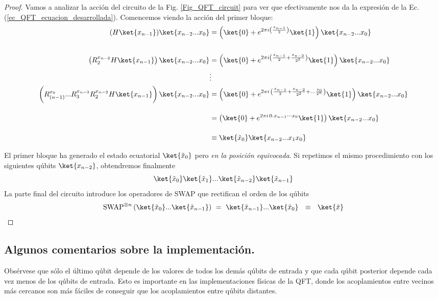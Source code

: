 \documentclass[a4paper,11pt]{book} %
\numberwithin{equation}{chapter}
\begin{document}
\begin{proof}
Vamos a analizar la acción del circuito de la Fig. \ref{Fig_QFT_circuit} para ver que efectivamente nos da la expresión de la Ec. (\ref{ec_QFT_ecuacion_desarrollada}). Comencemos viendo la acción del primer bloque:
	\begin{align*}
	(H\ket{x_{n-1}})\ket{x_{n-2}...x_0} & = \left( \ket{0} + e^{2\pi i \left(\frac{x_{n-1}}{2}\right)} \ket{1}\right) \ket{x_{n-2}...x_0}  \\ \rule{0mm}{10mm}
	\left(\rule{0mm}{3mm} R_{2}^{x_{n-2}}H\ket{x_{n-1}}\right) \ket{x_{n-2}...x_0}  & =  \left( \ket{0} + e^{2\pi i \left(\frac{x_{n-1}}{2} + \frac{x_{n-2}}{2^2}\right)} \ket{1}\right) \ket{x_{n-2}...x_0} \\ 
	& \vdots \\
	\left(\rule{0mm}{5mm}R_{{(n-1)}}^{x_{0}} ... R_{3} ^{x_{n-3}}  R_{2}^{x_{n-2}}H\ket{x_{n-1}}\right) \ket{x_{n-2}...x_0} & =  \left( \ket{0} + e^{2\pi i \, \left(\frac{x_{n-1}}{2} + \frac{x_{n-2}}{2^2}+\ldots \frac{x_0}{2^n}\right)}  \ket{1} \right) \ket{x_{n-2}...x_0} \\ \rule{0mm}{7mm}  
	& =  \left(\ket{0} + e^{2\pi i \, 0.x_{n-1}\cdots x_0}  \ket{1} \right) \ket{x_{n-2}...x_0} \\ \rule{0mm}{7mm}  
	& \equiv \ket{\tilde x_{0}} \ket{x_{n-2}... x_1x_0} 
	\end{align*}

	El primer bloque ha generado el estado ecuatorial $\ket{\tilde x_0}$ pero \textit{en la posición equivocada}. Si repetimos el mismo procedimiento con los siguientes qúbits $\ket{x_{n-2}}$, obtendremos finalmente
\begin{equation}
 \ket{\tilde x_{0}}\ket{\tilde x_{1}}  ... \ket{\tilde{x}_{n-2}} \ket{\tilde x_{n-1}}
\end{equation}
La parte final del circuito introduce los operadores de SWAP que rectifican el orden de los qúbits 
\begin{equation}
\hbox{SWAP}^{\otimes n} \,  (\ket{\tilde x_{0}}  ...  \ket{\tilde x_{n-1}} ) ~=~ 
\ket{\tilde x_{n-1}} ... \ket{\tilde{x}_{0}} ~~ \equiv ~~ \ket{\tilde x}
\end{equation}	
\end{proof}
 
		\subsection{Algunos comentarios sobre la implementación.}

Obsérvese que sólo el último qúbit depende de los valores de todos los demás qúbits de entrada y que cada qúbit posterior depende cada vez menos de los qúbits de entrada. Esto es importante en las implementaciones físicas de la QFT, donde los acoplamientos entre vecinos más cercanos son más fáciles de conseguir que los acoplamientos entre qúbits distantes.
\end{document}
